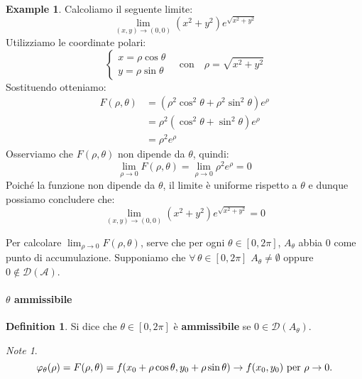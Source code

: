 \documentclass{article}
\theoremstyle{plain}
\theoremstyle{definition}
\newtheorem{defn}{Definition}[section]
\newtheorem{exmp}{Example}[section]
\theoremstyle{remark}
\newtheorem{note}{Note}
\begin{document}
\begin{exmp}
Calcoliamo il seguente limite:
\[
\lim_{(x,y)\to(0,0)}(x^2+y^2)e^{\sqrt{x^2+y^2}}
\]
Utilizziamo le coordinate polari:
\[
\begin{cases}
    x = \rho\cos\theta \\
    y = \rho\sin\theta
\end{cases}
\quad\text{con}\quad \rho = \sqrt{x^2+y^2}
\]
Sostituendo otteniamo:
\[
\begin{aligned}
    F(\rho,\theta) &= (\rho^2\cos^2\theta + \rho^2\sin^2\theta)e^{\rho} \\
    &= \rho^2(\cos^2\theta + \sin^2\theta)e^{\rho} \\
    &= \rho^2e^{\rho}
\end{aligned}
\]
Osserviamo che $F(\rho,\theta)$ non dipende da $\theta$, quindi:
\[
\lim_{\rho\to0}F(\rho,\theta) = \lim_{\rho\to0}\rho^2e^{\rho} = 0
\]
Poiché la funzione non dipende da $\theta$, il limite è uniforme rispetto a $\theta$ e dunque possiamo concludere che:
\[
\lim_{(x,y)\to(0,0)}(x^2+y^2)e^{\sqrt{x^2+y^2}} = 0
\]
\end{exmp}

\vspace{10pt}

Per calcolare $\lim_{\rho\to0}F(\rho,\theta)$, serve che per ogni $\theta\in[0,2\pi]$, $A_\theta$ abbia $0$ come punto di accumulazione.
Supponiamo che $\forall\,\theta\in[0,2\pi]$ $A_\theta\neq\emptyset$ oppure $0\notin\mathcal{D(A)}$.

\vspace{10pt}

\paragraph{$\theta$ ammissibile}
\begin{bxthm}
\begin{defn}
    Si dice che $\theta\in[0,2\pi]$ è \textbf{ammissibile} se $0\in\mathcal{D}(A_\theta)$.
\end{defn}
\end{bxthm}

\vspace{10pt}

\begin{note}
    \[\varphi_\theta(\rho)=F(\rho,\theta)=f(x_0+\rho\cos\theta,y_0+\rho\sin\theta)\to f(x_0,y_0)\textup{ per }\rho\to0.\]
\end{note}

\vspace{10pt}
\end{document}
